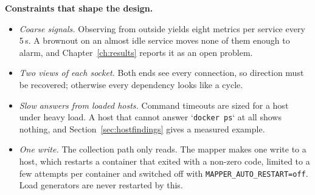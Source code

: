 \textbf{Constraints that shape the design.}
\begin{itemize}
\item \emph{Coarse signals.} Observing from outside yields eight metrics per service every 5\,s. A brownout on an almost idle service moves none of them enough to alarm, and Chapter~\ref{ch:results} reports it as an open problem.
\item \emph{Two views of each socket.} Both ends see every connection, so direction must be recovered; otherwise every dependency looks like a cycle.
\item \emph{Slow answers from loaded hosts.} Command timeouts are sized for a host under heavy load. A host that cannot answer `\texttt{docker ps}` at all shows nothing, and Section~\ref{sec:hostfindings} gives a measured example.
\item \emph{One write.} The collection path only reads. The mapper makes one write to a host, which restarts a container that exited with a non-zero code, limited to a few attempts per container and switched off with \texttt{MAPPER\_AUTO\_RESTART=off}. Load generators are never restarted by this.
\end{itemize}
